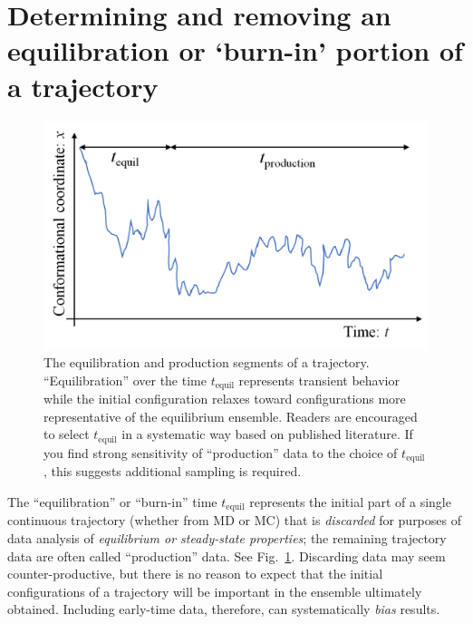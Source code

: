 
\section{Determining and removing an equilibration or `burn-in' portion of a trajectory}
\label{sec:equil}

\begin{figure}
  \centering
  \includegraphics[width=0.9\linewidth]{figures/tequil-time-trace}
  \caption{
  \label{fig:tequil}
  The equilibration and production segments of a trajectory.
  ``Equilibration'' over the time $t_{\mathrm{equil}}$ represents transient behavior while the initial configuration relaxes toward configurations more representative of the equilibrium ensemble.
  Readers are encouraged to select $t_{\mathrm{equil}}$ in a systematic way based on published literature.
  If you find strong sensitivity of ``production'' data to the choice of $t_{\mathrm{equil}}$, this suggests additional sampling is required.
  }
\end{figure}

The ``equilibration'' or ``burn-in'' time $t_{\mathrm{equil}}$ represents the initial part of a single continuous trajectory (whether from MD or MC) that is \emph{discarded} for purposes of data analysis of \emph{equilibrium or steady-state properties};
the remaining trajectory data are often called ``production'' data.
See Fig.\ \ref{fig:tequil}.
Discarding data may seem counter-productive, but there is no reason to expect that the initial configurations of a trajectory will be important in the ensemble ultimately obtained.
Including early-time data, therefore, can systematically \emph{bias} results.

